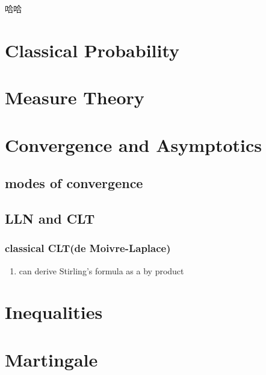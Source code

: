 \documentclass[11pt]{article}
\author{Chuan Liu}
\date{\today}
\title{}
\begin{document}
\tableofcontents

哈哈


\section{Classical Probability}
\label{sec:orgc6f9b6b}

\section{Measure Theory}
\label{sec:org3880f11}

\section{Convergence and Asymptotics}
\label{sec:org8f5d350}

\subsection{modes of convergence}
\label{sec:org9d44007}

\subsection{LLN and CLT}
\label{sec:orgca35f3d}

\subsubsection{classical CLT(de Moivre-Laplace)}
\label{sec:org60a9648}

\begin{enumerate}
\item can derive Stirling's formula as a by product
\label{sec:org737519a}
\end{enumerate}

\section{Inequalities}
\label{sec:org329e720}

\section{Martingale}
\label{sec:orgc6c09a5}
\end{document}
